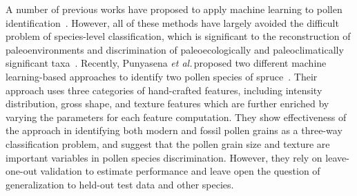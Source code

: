 \documentclass[10pt,twocolumn,letterpaper]{article}
\def\etal{{\em et al.\/}\,}
\begin{document}
A number of previous works have proposed to apply machine learning to pollen
identification~\cite{langford1990computerized,li1999pollen,france2000new,ronneberger2002automated,li2004towards,treloar2004towards,zhang2004towards,chen2006feasibility,dell2009pollen,landsmeer2009detection,holt2011progress}.
However,
all of these methods have largely avoided the difficult problem of species-level classification,
which is significant to the reconstruction of paleoenvironments and discrimination of paleoecologically and paleoclimatically significant taxa~\cite{punyasena2012classifying}.
Recently,
Punyasena \etal proposed two different machine learning-based approaches to identify two pollen species of spruce~\cite{punyasena2012classifying,tcheng2016visual}.
Their approach uses three categories of hand-crafted features,
including intensity distribution, gross shape, and texture features
which are further enriched by varying the parameters for each feature computation.
They show effectiveness of the approach in identifying both modern and fossil pollen grains as a three-way classification problem,
and suggest that the pollen grain size and texture are important variables in pollen species discrimination.
However, they rely on leave-one-out validation to estimate performance and leave open the
question of generalization to held-out test data and other species.


\end{document}
